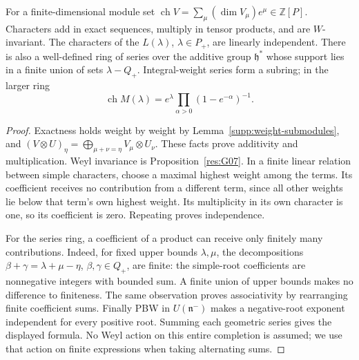 \begin{proposition}
\label{res:H01}
For a finite-dimensional module set
\(\operatorname{ch}V=\sum_\mu(\dim V_\mu)e^\mu\in\mathbb Z[P]\).
Characters add in exact sequences, multiply in tensor products,
and are \(W\)-invariant. The characters of the \(L(\lambda)\),
\(\lambda\in P_+\), are linearly independent.
There is also a well-defined ring of series over the additive group
\(\mathfrak h^*\) whose support lies in a finite union of sets
\(\lambda-Q_+\). Integral-weight series form a subring; in the
larger ring
\[
 \operatorname{ch}M(\lambda)
   =e^\lambda\prod_{\alpha>0}(1-e^{-\alpha})^{-1}.
\]
\end{proposition}
\begin{proof}
Exactness holds weight by weight by
Lemma~\ref{supp:weight-submodules}, and
\((V\otimes U)_\eta=\bigoplus_{\mu+\nu=\eta}V_\mu\otimes U_\nu\).
These facts prove additivity and multiplication.
Weyl invariance is Proposition~\ref{res:G07}.
In a finite linear relation between simple characters, choose a
maximal highest weight among the terms. Its coefficient receives
no contribution from a different term, since all other weights
lie below that term's own highest weight. Its multiplicity in its
own character is one, so its coefficient is zero. Repeating proves
independence.

For the series ring, a coefficient of a product can receive only
finitely many contributions. Indeed, for fixed upper bounds
\(\lambda,\mu\), the decompositions
\(\beta+\gamma=\lambda+\mu-\eta\), \(\beta,\gamma\in Q_+\),
are finite: the simple-root coefficients are nonnegative integers
with bounded sum. A finite union of upper bounds makes no
difference to finiteness. The same observation proves associativity
by rearranging finite coefficient sums.
Finally PBW in \(U(\mathfrak n^-)\) makes a negative-root exponent
independent for every positive root. Summing each geometric series
gives the displayed formula. No Weyl action on this entire
completion is assumed; we use that action on finite expressions
when taking alternating sums.
\end{proof}

